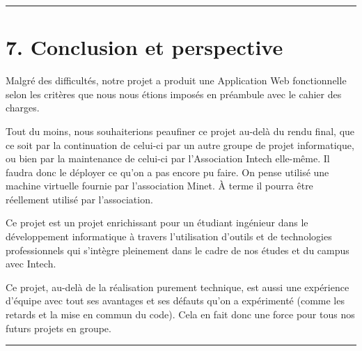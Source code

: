 \begin{center}\rule{0.5\linewidth}{0.5pt}\end{center}

\newpage

\hypertarget{conclusion-et-perspective}{%
\section{7. Conclusion et perspective}\label{conclusion-et-perspective}}

Malgré des difficultés, notre projet a produit une Application Web
fonctionnelle selon les critères que nous nous étions imposés en
préambule avec le cahier des charges.

Tout du moins, nous souhaiterions peaufiner ce projet au-delà du rendu
final, que ce soit par la continuation de celui-ci par un autre groupe
de projet informatique, ou bien par la maintenance de celui-ci par
l'Association Intech elle-même. Il faudra donc le déployer ce qu'on a
pas encore pu faire. On pense utilisé une machine virtuelle fournie par
l'association Minet. À terme il pourra être réellement utilisé par
l'association.

Ce projet est un projet enrichissant pour un étudiant ingénieur dans le
développement informatique à travers l'utilisation d'outils et de
technologies professionnels qui s'intègre pleinement dans le cadre de
nos études et du campus avec Intech.

Ce projet, au-delà de la réalisation purement technique, est aussi une
expérience d'équipe avec tout ses avantages et ses défauts qu'on a
expérimenté (comme les retards et la mise en commun du code). Cela en
fait donc une force pour tous nos futurs projets en groupe.

\begin{center}\rule{0.5\linewidth}{0.5pt}\end{center}
